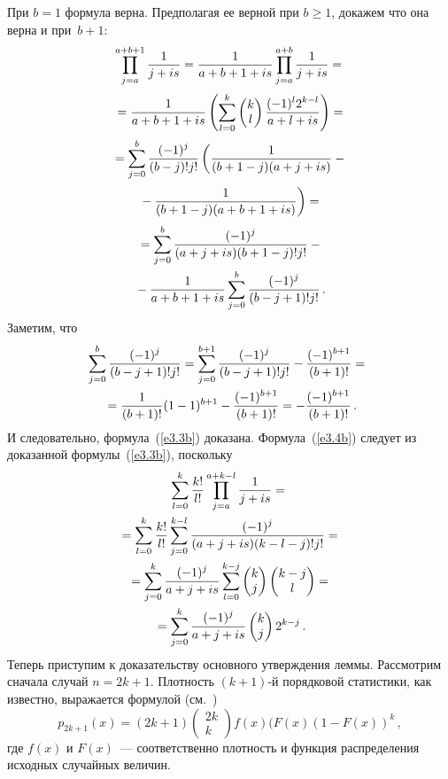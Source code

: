 \begin{multicols}{2}
При $b=1$ формула верна. Предполагая ее верной при $b\ge1$,
докажем что она  верна и  при~$b+1$:
\begin{multline*}
\prod\limits_{j=a}^{a+b+1}\fr{1}{j+is}=\fr{1}{a+b+1+is}\prod\limits_{j=a}^{a+b}
\fr{1}{j+is}={}\\[2pt]
{}=
\fr{1}{a+b+1+is}\left(\sum\limits_{l=0}^k 
\begin{pmatrix}
k\\ l
\end{pmatrix}
\fr{(-1)^l 2^{k-l}}
{a+l+is}\right)={}\\[2pt]
{}=
\sum\limits_{j=0}^{b}\fr{(-1)^j}{(b-j)!j!} \left(\fr{1}{(b+1-j)(a+j+is)}
- {}\right.\\[2pt]
\left.{}-\fr{1}{(b+1-j)(a+b+1+is)} \right)={}
\end{multline*}
\begin{multline*}
{}=
\sum\limits_{j=0}^{b}\fr{(-1)^j}{(a+j+is)(b+1-j)!j!}-{}\\
{}-
\fr{1}{a+b+1+is}\sum\limits_{j=0}^{b}\fr{(-1)^j}{(b-j+1)!j!}\,.
\end{multline*}
Заметим, что
\begin{multline*}
\!\!\sum\limits_{j=0}^b\fr{(-1)^j}{(b-j+1)!j!}=
\sum\limits_{j=0}^{b+1}\fr{(-1)^j}{(b-j+1)!j!}
-\fr{(-1)^{b+1}}{(b+1)!}={}\\
{}=
\fr{1}{(b+1)!}(1-1)^{b+1}-\fr{(-1)^{b+1}}{(b+1)!}=
-\fr{(-1)^{b+1}}{(b+1)!}\,.
\end{multline*}
И следовательно, формула~(\ref{e3.3b}) доказана.
Формула~(\ref{e3.4b}) следует  из доказанной формулы~(\ref{e3.3b}), по\-скольку
\begin{multline*}
\sum_{l=0}^k{\fr{k!}{l!}}\prod\limits_{j=a}^{a+k-l}\fr{1}{j+is}={}\\
{}=
\sum\limits_{l=0}^{k}\fr{k!}{l!}\sum\limits_{j=0}^{k-l}
\fr{(-1)^j}{(a+j+is)(k-l-j)! j!}={}\\
{}
=\sum\limits_{j=0}^{k}\fr{(-1)^j}{a+j+is}\sum\limits_{l=0}^{k-j}
\begin{pmatrix}
k\\ j
\end{pmatrix}
\begin{pmatrix}
k-j\\  l
\end{pmatrix}={}\\
{}=
\sum\limits_{j=0}^k\fr{(-1)^j}{a+j+is}
\begin{pmatrix}
k\\ j
\end{pmatrix}
2^{k-j}\,.
\end{multline*}
Теперь приступим к доказательству основного утверждения леммы.
Рассмотрим сначала случай $n=2k+1$.
Плотность $(k+1)$-й порядковой статистики, как известно,
выражается формулой (см.~\cite{4ben})
\begin{equation*}
p_{2k+1}(x) = (2k+1)
\begin{pmatrix}
2k\\  k\end{pmatrix}
f(x)(F(x)(1-F(x))^k\,,
\end{equation*}
где $f(x)$ и  $F(x)$~--- соответственно плотность и
функция распределения исходных случайных величин.


\end{multicols}

